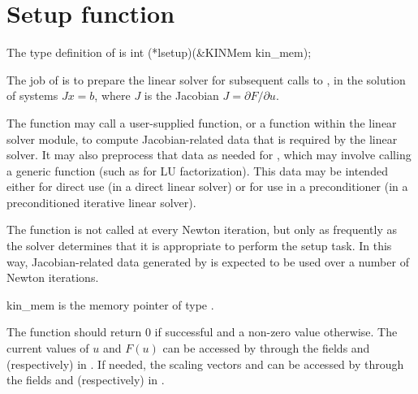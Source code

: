 
\section{Setup function} 
The type definition of  is
{
  int (*lsetup)(&KINMem kin\_mem);
}
{
  The job of  is to prepare the linear solver for subsequent 
  calls to , in the solution of systems $J x = b$, where         
  $J$ is the Jacobian $J = \partial F / \partial u$.

  The  function may call a user-supplied function, or a function
  within the linear solver module, to compute Jacobian-related data
  that is required by the linear solver.  It may also preprocess that
  data as needed for , which may involve calling a generic
  function (such as for LU factorization).  This data may be intended
  either for direct use (in a direct linear solver) or for use in a
  preconditioner (in a preconditioned iterative linear solver).

  The  function is not called at every Newton iteration, but only
  as frequently as the solver determines that it is appropriate to perform
  the setup task.  In this way, Jacobian-related data generated by 
  is expected to be used over a number of Newton iterations.
}
{
  \begin{args}
  \item[kin\_mem]
    is the {\kinsol} memory pointer of type .
  \end{args}
}
{
  The  function should return 0 if successful and
  a non-zero value otherwise.
}
{
  The current values of $u$ and $F(u)$ can be accessed by  through
  the fields  and  (respectively) in .
  If needed, the scaling vectors  and  can be
  accessed by  through the fields  and 
  (respectively) in .
}


